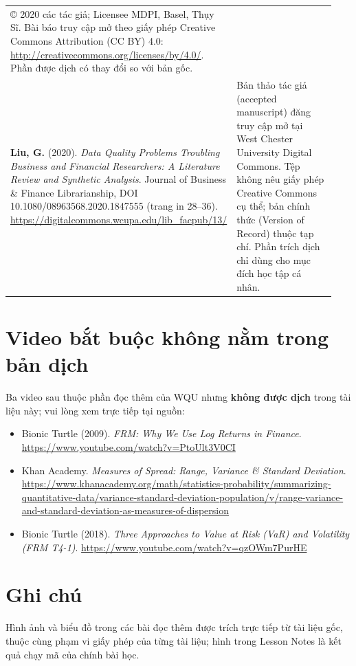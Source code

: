 {\begin{longtable}{>{\raggedright\arraybackslash}p{0.34\linewidth}>{\raggedright\arraybackslash}p{0.60\linewidth}}
© 2020 các tác giả; Licensee MDPI, Basel, Thụy Sĩ. Bài báo truy cập mở theo giấy phép Creative Commons Attribution (CC BY) 4.0: \url{http://creativecommons.org/licenses/by/4.0/}. Phần được dịch có thay đổi so với bản gốc. \\
\addlinespace
\textbf{Liu, G.} (2020). \emph{Data Quality Problems Troubling Business and Financial Researchers: A Literature Review and Synthetic Analysis}. Journal of Business \& Finance Librarianship, DOI 10.1080/08963568.2020.1847555 (trang in 28--36). \url{https://digitalcommons.wcupa.edu/lib_facpub/13/} &
Bản thảo tác giả (accepted manuscript) đăng truy cập mở tại West Chester University Digital Commons. Tệp không nêu giấy phép Creative Commons cụ thể; bản chính thức (Version of Record) thuộc tạp chí. Phần trích dịch chỉ dùng cho mục đích học tập cá nhân. \\
\bottomrule
\end{longtable}
}

\section*{Video bắt buộc không nằm trong bản dịch}

Ba video sau thuộc phần đọc thêm của WQU nhưng \textbf{không được dịch} trong tài liệu này; vui lòng xem trực tiếp tại nguồn:
\begin{itemize}
  \item Bionic Turtle (2009). \emph{FRM: Why We Use Log Returns in Finance}. \url{https://www.youtube.com/watch?v=PtoUlt3V0CI}
  \item Khan Academy. \emph{Measures of Spread: Range, Variance \& Standard Deviation}. \url{https://www.khanacademy.org/math/statistics-probability/summarizing-quantitative-data/variance-standard-deviation-population/v/range-variance-and-standard-deviation-as-measures-of-dispersion}
  \item Bionic Turtle (2018). \emph{Three Approaches to Value at Risk (VaR) and Volatility (FRM T4-1)}. \url{https://www.youtube.com/watch?v=qzOWm7PurHE}
\end{itemize}

\section*{Ghi chú}

Hình ảnh và biểu đồ trong các bài đọc thêm được trích trực tiếp từ tài liệu gốc, thuộc cùng phạm vi giấy phép của từng tài liệu; hình trong Lesson Notes là kết quả chạy mã của chính bài học.
